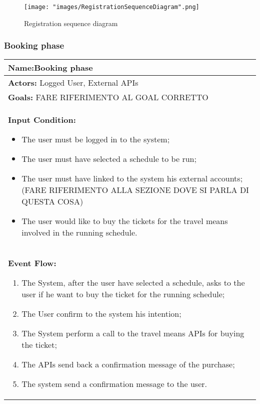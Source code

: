 \begin{figure}[H]
\begin{center}
\texttt{[image: "images/RegistrationSequenceDiagram".png]}
\caption{Registration sequence diagram}
\label{img:seqDiagrAppEditing00}
\end{center}
\end{figure}

\subsubsection{Booking phase} \label{usecase:Booking Phase}

\begin{longtable}{|p{14cm}|} \hline

\textbf{Name:}Booking phase \\ \hline

\textbf{Actors:} Logged User, External APIs \\ \hline

\textbf{Goals:} FARE RIFERIMENTO AL GOAL CORRETTO \\ \hline

\textbf{Input Condition:}

\begin{itemize}
\item The user must be logged in to the system;
\item The user must have selected a schedule to be run;
\item The user must have linked to the system his external accounts;(FARE RIFERIMENTO ALLA SEZIONE DOVE SI PARLA DI QUESTA COSA)
\item The user would like to buy the tickets for the travel means involved in the running schedule.
\end{itemize}
 \\ \hline

\textbf{Event Flow:}

\begin{enumerate}
\item The System, after the user have selected a schedule, asks to the user if he want to buy the ticket for the running schedule;
\item The User confirm to the system his intention;
\item The System perform a call to the travel means APIs for buying the ticket;
\item The APIs send back a confirmation message of the purchase;
\item The system send a confirmation message to the user.
\end{enumerate}	\\ \hline


\end{longtable}
